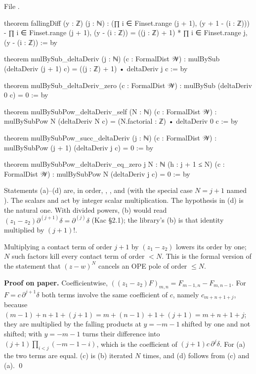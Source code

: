 \noindent File .
\begin{leancode}
theorem fallingDiff (y : ℤ) (j : ℕ) :
    (∏ i ∈ Finset.range (j + 1), (y + 1 - (i : ℤ))) - ∏ i ∈ Finset.range (j + 1), (y - (i : ℤ))
      = ((j : ℤ) + 1) * ∏ i ∈ Finset.range j, (y - (i : ℤ)) := by

theorem mulBySub_deltaDeriv (j : ℕ) (c : FormalDist 𝒲) :
    mulBySub (deltaDeriv (j + 1) c) = ((j : ℤ) + 1) • deltaDeriv j c := by

theorem mulBySub_deltaDeriv_zero (c : FormalDist 𝒲) : mulBySub (deltaDeriv 0 c) = 0 := by

theorem mulBySubPow_deltaDeriv_self (N : ℕ) (c : FormalDist 𝒲) :
    mulBySubPow N (deltaDeriv N c) = (N.factorial : ℤ) • deltaDeriv 0 c := by

theorem mulBySubPow_succ_deltaDeriv (j : ℕ) (c : FormalDist 𝒲) :
    mulBySubPow (j + 1) (deltaDeriv j c) = 0 := by

theorem mulBySubPow_deltaDeriv_eq_zero {j N : ℕ} (h : j + 1 ≤ N) (c : FormalDist 𝒲) :
    mulBySubPow N (deltaDeriv j c) = 0 := by
\end{leancode}

\begin{dictionary}
Statements (a)--(d) are, in order, , ,
 and  (with the special case $N = j+1$
named ). The scalars  and  act by
integer scalar multiplication. The hypothesis  in (d) is the natural one. With divided
powers, (b) would read $(z_1-z_2)\partial^{(j+1)}\delta = \partial^{(j)}\delta$ (Kac §2.1); the library's (b) is
that identity multiplied by $(j+1)!$.
\end{dictionary}

\begin{physics}
Multiplying a contact term of order $j+1$ by $(z_1-z_2)$ lowers its order by one; $N$ such factors kill
every contact term of order $<N$. This is the formal version of the statement that $(z-w)^N$ cancels an
OPE pole of order $\le N$.
\end{physics}

\textbf{Proof on paper.} Coefficientwise,
$((z_1-z_2)F)_{m,n} = F_{m-1,n}-F_{m,n-1}$. For $F = c\,\partial^{j+1}\delta$ both terms involve the same
coefficient of $c$, namely $c_{m+n+1+j}$, because $(m-1)+n+1+(j+1) = m+(n-1)+1+(j+1) = m+n+1+j$; they are multiplied by the falling products at $y = -m-1$ shifted by one
and not shifted;  with $y = -m-1$ turns their difference into $(j+1)\prod_{i<j}(-m-1-i)$,
which is the coefficient of $(j+1)c\,\partial^j\delta$. For (a) the two terms are equal. (c) is (b) iterated
$N$ times, and (d) follows from (c) and (a). \qed

